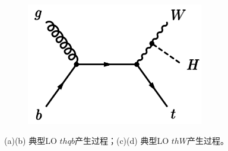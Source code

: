 \begin{figure}[h]
\begin{subfigure}[b]{0.33\textwidth}
  \caption{}
  \label{fig:diagram_ggzh1}
 \end{subfigure}
 \begin{subfigure}[b]{0.33\textwidth}
  \includegraphics[width=0.85\textwidth]{fig/diagram_thW2.png}
  \caption{}
  \label{fig:diagram_ggzh1}
 \end{subfigure}
\caption{(a)(b) 典型LO $thqb$产生过程；(c)(d) 典型LO $thW$产生过程。}
\label{fig:diagram_th}
\end{figure}


